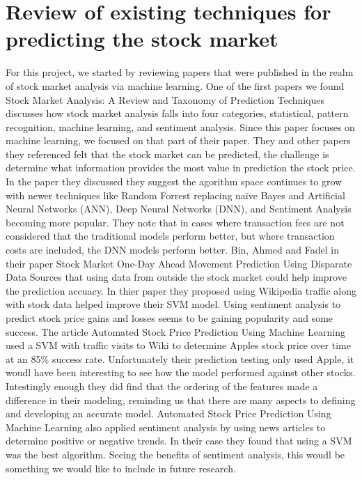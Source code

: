 \documentclass[conference]{IEEEtran}
\begin{document}
\section{Review of existing techniques for predicting the stock market}
For this project, we started by reviewing papers that were published in the realm of stock market analysis via machine learning.  One of the first papers we found Stock Market Analysis: A Review and Taxonomy of Prediction Techniques \cite{TaxonomyofPrediction} discusses how stock market analysis falls into four categories, statistical, pattern recognition, machine learning, and sentiment analysis.  Since this paper focuses on machine learning, we focused on that part of their paper.  They and other papers they referenced felt that the stock market can be predicted, the challenge is determine what information provides the most value in prediction the stock price.  In the paper they discussed they suggest the agorithm space continues to grow with newer techniques like Random Forrest replacing naïve Bayes and  Artificial Neural Networks (ANN), Deep Neural Networks (DNN), and Sentiment Analysis becoming more popular.  They note that in cases where transaction fees are not considered that the traditional models perform better, but where transaction costs are included, the DNN models perform better. Bin, Ahmed and Fadel in their paper Stock Market One-Day Ahead Movement Prediction Using Disparate Data Sources\cite {Onedayahead} that using data from outside the stock market could help improve the prediction accuacy.  In thier paper they proposed using Wikipedia traffic along with stock data helped improve their SVM model.  Using sentiment analysis to predict stock price gains and losses seems to be gaining popularity and some success.  The article Automated Stock Price Prediction Using Machine Learning \cite{AutomatedPrediction} used a SVM with traffic visits to Wiki to determine Apples stock price over time at an 85\% success rate. Unfortunately their prediction testing only used Apple, it woudl have been interesting to see how the model performed against other stocks.  Intestingly enough they did find that the ordering of the features made a difference in their modeling, reminding us that there are many aspects to defining and developing an accurate model.  Automated Stock Price Prediction Using Machine Learning \cite{AutomatedPrediction} also applied sentiment analysis by using news articles to determine positive or negative trends. In their case they found that using a SVM was the best algorithm.  Seeing the benefits of sentiment analysis, this woudl be something we would like to include in future research. 
\end{document}
